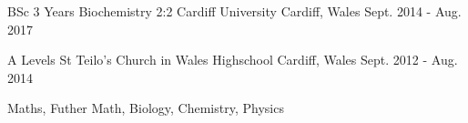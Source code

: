 

\begin{cventries}

  \cventry
    {BSc 3 Years Biochemistry 2:2} %
    {Cardiff University} %
    {Cardiff, Wales} %
    {Sept. 2014 - Aug. 2017} %
    {
      \begin{cvitems} %
      \end{cvitems}
    }

\cventry
{A Levels} %
{St Teilo's Church in Wales Highschool} %
{Cardiff, Wales} %
{Sept. 2012 - Aug. 2014} %
{
  \begin{cvitems} %
    \item {Maths, Futher Math, Biology, Chemistry, Physics}
  \end{cvitems}
}

\end{cventries}
